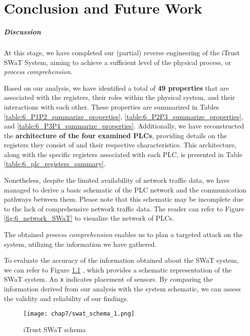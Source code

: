 \chapter{Conclusion and Future Work}
\label{conclusions}
\linenumbers

\paragraph{Discussion}
\label{par:7_discussion}
At this stage, we have completed our (partial) reverse engineering of the iTrust SWaT System, aiming to achieve a sufficient level of the physical process, or \textit{process comprehension}. 

\bigskip
Based on our analysis, we have identified a total of \textbf{49 properties} that are associated with the registers, their roles within the physical system, and their interactions with each other. These properties are summarized in Tables \ref{table:6_P1P2_summarize_properties}, \ref{table:6_P2P3_summarize_properties}, and \ref{table:6_P3P4_summarize_properties}. Additionally, we have reconstructed the \textbf{architecture of the four examined PLCs}, providing details on the registers they consist of and their respective characteristics. This architecture, along with the specific registers associated with each PLC, is presented in Table \ref{table:6_plc_registers_summary}.

Nonetheless, despite the limited availability of network traffic data, we have managed to derive a basic schematic of the PLC network and the communication pathways between them. Please note that this schematic may be incomplete due to the lack of comprehensive network traffic data. The reader can refer to Figure \ref{fig:6_network_SWaT} to visualize the network of PLCs.

The obtained \textit{process comprehension} enables us to plan a targeted attack on the system, utilizing the information we have gathered.

\bigskip
To evaluate the accuracy of the information obtained about the SWaT system, we can refer to Figure \ref{fig:7_swat_schema} \cite{swat_tecnical_pdf}, which provides a schematic representation of the SWaT system. An \texttt{x} indicates placement of sensors. By comparing the information derived from our analysis with the system schematic, we can assess the validity and reliability of our findings.

\begin{figure}[ht]
	\centering
	\texttt{[image: chap7/swat\_schema\_1.png]}
	\caption{iTrust SWaT schema}
	\label{fig:7_swat_schema}
\end{figure}

